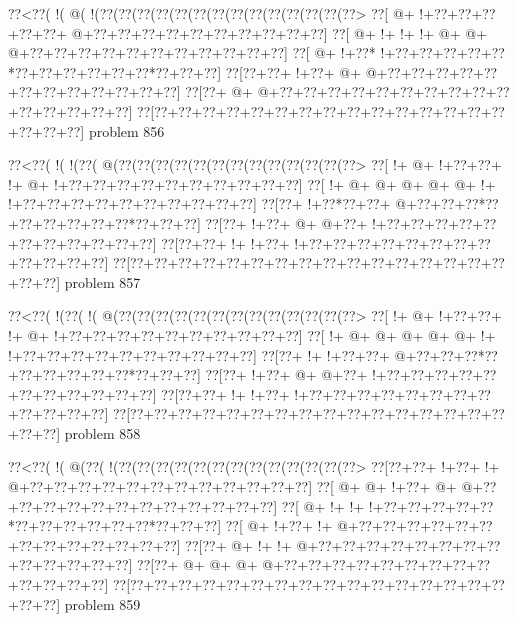 \vbox{\vbox{\goo
\0??<\0??(\- !(\- @(\- !(\0??(\0??(\0??(\0??(\0??(\0??(\0??(\0??(\0??(\0??(\0??(\0??(\0??(\0??>
\0??[\- @+\- !+\0??+\0??+\0??+\0??+\0??+\- @+\0??+\0??+\0??+\0??+\0??+\0??+\0??+\0??+\0??+\0??]
\0??[\- @+\- !+\- !+\- !+\- @+\- @+\- @+\0??+\0??+\0??+\0??+\0??+\0??+\0??+\0??+\0??+\0??+\0??]
\0??[\- @+\- !+\0??*\- !+\0??+\0??+\0??+\0??+\0??*\0??+\0??+\0??+\0??+\0??+\0??*\0??+\0??+\0??]
\0??[\0??+\0??+\- !+\0??+\- @+\- @+\0??+\0??+\0??+\0??+\0??+\0??+\0??+\0??+\0??+\0??+\0??+\0??]
\0??[\0??+\- @+\- @+\0??+\0??+\0??+\0??+\0??+\0??+\0??+\0??+\0??+\0??+\0??+\0??+\0??+\0??+\0??]
\0??[\0??+\0??+\0??+\0??+\0??+\0??+\0??+\0??+\0??+\0??+\0??+\0??+\0??+\0??+\0??+\0??+\0??+\0??]
}
\hfil problem 856\hfil\break
}



\vbox{\vbox{\goo
\0??<\0??(\- !(\- !(\0??(\- @(\0??(\0??(\0??(\0??(\0??(\0??(\0??(\0??(\0??(\0??(\0??(\0??(\0??>
\0??[\- !+\- @+\- !+\0??+\0??+\- !+\- @+\- !+\0??+\0??+\0??+\0??+\0??+\0??+\0??+\0??+\0??+\0??]
\0??[\- !+\- @+\- @+\- @+\- @+\- @+\- !+\- !+\0??+\0??+\0??+\0??+\0??+\0??+\0??+\0??+\0??+\0??]
\0??[\0??+\- !+\0??*\0??+\0??+\- @+\0??+\0??+\0??*\0??+\0??+\0??+\0??+\0??+\0??*\0??+\0??+\0??]
\0??[\0??+\- !+\0??+\- @+\- @+\0??+\- !+\0??+\0??+\0??+\0??+\0??+\0??+\0??+\0??+\0??+\0??+\0??]
\0??[\0??+\0??+\- !+\- !+\0??+\- !+\0??+\0??+\0??+\0??+\0??+\0??+\0??+\0??+\0??+\0??+\0??+\0??]
\0??[\0??+\0??+\0??+\0??+\0??+\0??+\0??+\0??+\0??+\0??+\0??+\0??+\0??+\0??+\0??+\0??+\0??+\0??]
}
\hfil problem 857\hfil\break
}



\vbox{\vbox{\goo
\0??<\0??(\- !(\0??(\- !(\- @(\0??(\0??(\0??(\0??(\0??(\0??(\0??(\0??(\0??(\0??(\0??(\0??(\0??>
\0??[\- !+\- @+\- !+\0??+\0??+\- !+\- @+\- !+\0??+\0??+\0??+\0??+\0??+\0??+\0??+\0??+\0??+\0??]
\0??[\- !+\- @+\- @+\- @+\- @+\- @+\- !+\- !+\0??+\0??+\0??+\0??+\0??+\0??+\0??+\0??+\0??+\0??]
\0??[\0??+\- !+\- !+\0??+\0??+\- @+\0??+\0??+\0??*\0??+\0??+\0??+\0??+\0??+\0??*\0??+\0??+\0??]
\0??[\0??+\- !+\0??+\- @+\- @+\0??+\- !+\0??+\0??+\0??+\0??+\0??+\0??+\0??+\0??+\0??+\0??+\0??]
\0??[\0??+\0??+\- !+\- !+\0??+\- !+\0??+\0??+\0??+\0??+\0??+\0??+\0??+\0??+\0??+\0??+\0??+\0??]
\0??[\0??+\0??+\0??+\0??+\0??+\0??+\0??+\0??+\0??+\0??+\0??+\0??+\0??+\0??+\0??+\0??+\0??+\0??]
}
\hfil problem 858\hfil\break
}



\vbox{\vbox{\goo
\0??<\0??(\- !(\- @(\0??(\- !(\0??(\0??(\0??(\0??(\0??(\0??(\0??(\0??(\0??(\0??(\0??(\0??(\0??>
\0??[\0??+\0??+\- !+\0??+\- !+\- @+\0??+\0??+\0??+\0??+\0??+\0??+\0??+\0??+\0??+\0??+\0??+\0??]
\0??[\- @+\- @+\- !+\0??+\- @+\- @+\0??+\0??+\0??+\0??+\0??+\0??+\0??+\0??+\0??+\0??+\0??+\0??]
\0??[\- @+\- !+\- !+\- !+\0??+\0??+\0??+\0??+\0??*\0??+\0??+\0??+\0??+\0??+\0??*\0??+\0??+\0??]
\0??[\- @+\- !+\0??+\- !+\- @+\0??+\0??+\0??+\0??+\0??+\0??+\0??+\0??+\0??+\0??+\0??+\0??+\0??]
\0??[\0??+\- @+\- !+\- !+\- @+\0??+\0??+\0??+\0??+\0??+\0??+\0??+\0??+\0??+\0??+\0??+\0??+\0??]
\0??[\0??+\- @+\- @+\- @+\- @+\0??+\0??+\0??+\0??+\0??+\0??+\0??+\0??+\0??+\0??+\0??+\0??+\0??]
\0??[\0??+\0??+\0??+\0??+\0??+\0??+\0??+\0??+\0??+\0??+\0??+\0??+\0??+\0??+\0??+\0??+\0??+\0??]
}
\hfil problem 859\hfil\break
}



